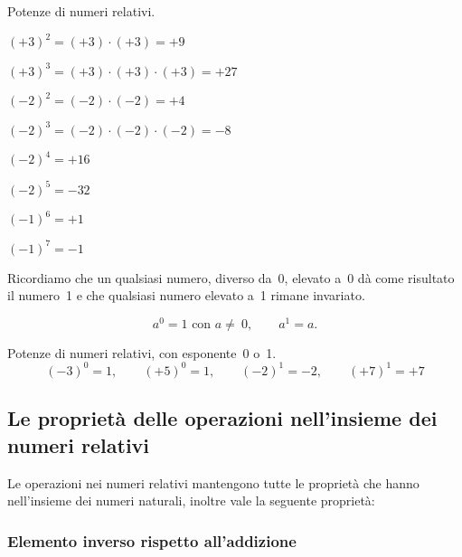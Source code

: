 \begin{exrig}
 \begin{esempio}
 Potenze di numeri relativi.
 \begin{multicols}{2}
 \begin{itemize*}
 \item $(+3)^2=(+3)\cdot(+3)=+9$
 \item $(+3)^3=(+3)\cdot(+3)\cdot(+3)=+27$
 \item $(-2)^2=(-2)\cdot(-2)=+4$
 \item $(-2)^3=(-2)\cdot(-2)\cdot(-2)=-8$
 \item $(-2)^4=+16$
 \item $(-2)^5=-32$
 \item $(-1)^6=+1$
 \item $(-1)^7=-1$
 \end{itemize*}
\end{multicols}
 \end{esempio}

\end{exrig}

Ricordiamo che un qualsiasi numero, diverso da~0, elevato a~0 dà come risultato 
il numero~1 e che qualsiasi
numero elevato a~1 rimane invariato.

\[a^0=1\text{ con }a\neq~0,\qquad a^1=a.\]

 \begin{exrig}
 \begin{esempio}
 Potenze di numeri relativi, con esponente~0 o~1.
\[(-3)^0=1,\qquad (+5)^0=1, \qquad (-2)^1=-2, \qquad (+7)^1=+7 \]
 \end{esempio}

\end{exrig}


\subsection{Le proprietà delle operazioni nell'insieme dei numeri relativi}

Le operazioni nei numeri relativi mantengono tutte le proprietà che hanno 
nell'insieme dei numeri naturali, inoltre vale la seguente proprietà:

\subsubsection{Elemento inverso rispetto all'addizione}

